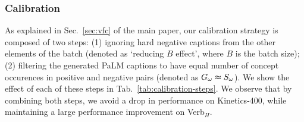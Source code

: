 \begin{table}
    \setlength{\tabcolsep}{6pt}
    \centering
     \vspace{0.2cm}
    \caption{
    \textbf{Fine-tuning image and text towers.} We report multi-choice accuracy on Verb$_H$~\cite{park-etal-2022-exposing} and Kinetics-400 top-1 accuracy. \SnowflakeChevron corresponds to freezing the image or text tower. We observe that fine-tuning both image and text towers works best. For experiments including hard negatives, we note that one hard negative is sampled for each video here.}
    \label{tab:finetuning-image-text}
\end{table}

\subsubsection{Calibration}\label{subsec:calibration-ablation}
As explained in Sec.~\ref{sec:vfc} of the main paper, our calibration strategy is composed of two steps: (1) ignoring hard negative captions from the other elements of the batch (denoted as `reducing $B$ effect', where $B$ is the batch size); (2) filtering the generated PaLM captions to have equal number of concept occurences in positive and negative pairs (denoted as $G_\omega \thickapprox S_\omega$). We show the effect of each of these steps in Tab.~\ref{tab:calibration-steps}. We observe that by combining both steps, we avoid a drop in performance on Kinetics-400, while maintaining a large performance improvement on Verb$_H$.


